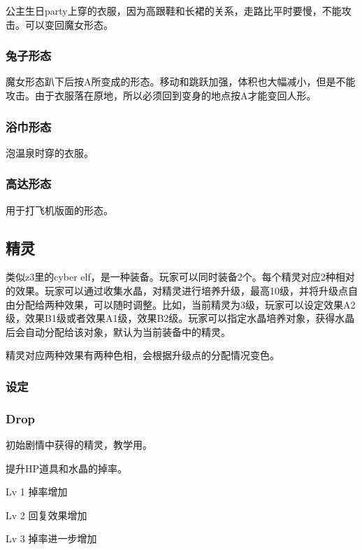 \documentclass{article}
\begin{document}
公主生日party上穿的衣服，因为高跟鞋和长裙的关系，走路比平时要慢，不能攻击。可以变回魔女形态。

\subsubsection{兔子形态}
\label{costume_bunny}

魔女形态趴下后按A所变成的形态。移动和跳跃加强，体积也大幅减小，但是不能攻击。由于衣服落在原地，所以必须回到变身的地点按A才能变回人形。

\subsubsection{浴巾形态}
\label{costume_bathtowel}

泡温泉时穿的衣服。

\subsubsection{高达形态}
\label{costume_gundam}

用于打飞机版面的形态。

\subsection{精灵}

类似z3里的cyber elf，是一种装备。玩家可以同时装备2个。每个精灵对应2种相对的效果。玩家可以通过收集水晶，对精灵进行培养升级，最高10级，并将升级点自由分配给两种效果，可以随时调整。比如，当前精灵为3级，玩家可以设定效果A2级，效果B1级或者效果A1级，效果B2级。玩家可以指定水晶培养对象，获得水晶后会自动分配给该对象，默认为当前装备中的精灵。

精灵对应两种效果有两种色相，会根据升级点的分配情况变色。

\subsubsection{设定}

\subsubsection{Drop}

初始剧情中获得的精灵，教学用。

提升HP道具和水晶的掉率。

Lv 1 掉率增加

Lv 2 回复效果增加

Lv 3 掉率进一步增加
\end{document}
